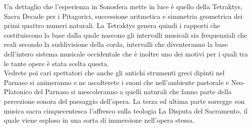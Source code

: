 \documentclass[hidelinks,12pt,a4paper]{article}
\begin{document}
\begin{flushleft}
			Un dettaglio che l'esperienza in Sonosfera mette in luce è quello della Tetraktys, Sacra Decade per i Pitagorici, successione aritmetica e simmetria geometrica dei primi quattro numeri naturali. La Tetraktys genera quindi i rapporti che costituiscono la base dalla quale nascono gli intervalli musicali sia frequenziali che reali secondo la suddivisione della corda, intervalli che diventeranno la base dell'intero sistema musicale occidentale che è inoltre uno dei motivi per i quali tra le tante opere è stata scelta questa.\\
			Vedrete poi cari spettatori che anche gli antichi strumenti greci dipinti nel Parnaso si animeranno e ne ascolterete i suoni che nell'ambiente pastorale e Neo-Platonico del Parnaso si mescoleranno a quelli naturali che fanno parte della percezione sonora del paesaggio dell'opera. La terza ed ultima parte sorregge con musica sacra cinquecentesca l'affresco sulla teologia La Disputa del Sacramento, il quale viene esploso in una sorta di immersione nell'opera stessa.
	
			\vspace*{\fill}
			\doclicenseThis
		\end{flushleft}
\end{document}
